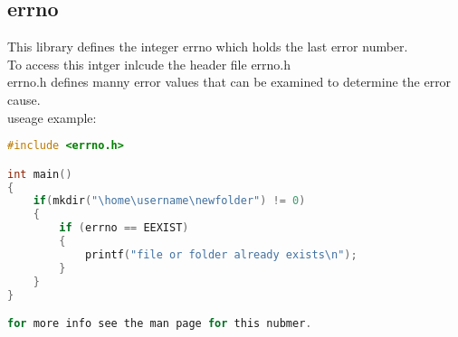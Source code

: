\documentclass{book}
\begin{document}
\subsection{errno}
This library defines the integer errno which holds the last error number.\\
To access this intger inlcude the header file errno.h\\
errno.h defines manny error values that can be examined to determine the error cause.\\

useage example:
\begin{lstlisting}[language=C]
#include <errno.h>

int main()
{
    if(mkdir("\home\username\newfolder") != 0)
    {
        if (errno == EEXIST)
        {
            printf("file or folder already exists\n");
        }
    }
} 

for more info see the man page for this nubmer.

\end{lstlisting}
\end{document}
